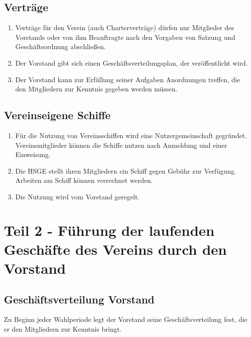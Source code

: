 \documentclass[10pt, twocolumn, parskip=half]{scrartcl}
\begin{document}
\subsection{Verträge}
\begin{enumerate}[noitemsep]
	\item  Verträge für den Verein (auch Charterverträge) dürfen nur Mitglieder des Vorstands oder von ihm Beauftragte nach den Vorgaben von Satzung und Geschäftsordnung abschließen.
	\item Der Vorstand gibt sich einen Geschäftsverteilungsplan, der veröffentlicht wird.
	\item Der Vorstand kann zur Erfüllung seiner Aufgaben Anordnungen treffen, die den Mitgliedern
	zur Kenntnis gegeben werden müssen.
\end{enumerate}

\subsection{Vereinseigene Schiffe}
\begin{enumerate}[noitemsep]
	\item Für die Nutzung von Vereinsschiffen wird eine Nutzergemeinschaft gegründet. Vereinsmitglieder können die Schiffe nutzen nach Anmeldung und einer Einweisung.
	\item Die HSGE stellt ihren Mitgliedern ein Schiff gegen Gebühr zur Verfügung. Arbeiten am Schiff können verrechnet werden.
	\item Die Nutzung wird vom Vorstand geregelt.
\end{enumerate}

\section*{Teil 2 - Führung der laufenden Geschäfte des Vereins durch den Vorstand}
\setcounter{subsection}{0}
\subsection{Geschäftsverteilung Vorstand}
Zu Beginn jeder Wahlperiode legt der Vorstand seine Geschäftsverteilung fest, die er den Mitgliedern zur Kenntnis bringt.
\end{document}
